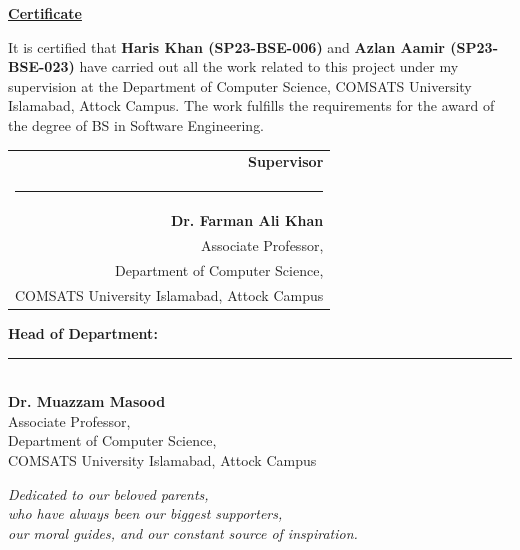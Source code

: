 \documentclass[A4paper,12pt]{report}
\theoremstyle{plain}
\theoremstyle{definition}
\theoremstyle{remark}
\numberwithin{equation}{section}
\begin{document}
\newpage
\begin{center}
\Large{\textbf{\underline{Certificate}}}
\end{center}
\vspace{0.2in}
\noindent It is certified that \textbf{Haris Khan (SP23-BSE-006)} and \textbf{Azlan Aamir (SP23-BSE-023)} have carried out all the work related to this project under my supervision at the Department of Computer Science, COMSATS University Islamabad, Attock Campus. The work fulfills the requirements for the award of the degree of BS in Software Engineering.
\\[0.4in]
\begin{flushright}
\begin{tabular}{@{}r@{}}
\textbf{Supervisor} \\[0.2in]
\rule{6cm}{0.4pt} \\
\textbf{Dr. Farman Ali Khan} \\
Associate Professor, \\
Department of Computer Science, \\
COMSATS University Islamabad, Attock Campus
\end{tabular}
\end{flushright}

\vspace{0.3in}
\begin{flushleft}
\textbf{Head of Department:} \\[0.2in]
\rule{6cm}{0.4pt} \\
\textbf{Dr. Muazzam Masood} \\
Associate Professor, \\
Department of Computer Science, \\
COMSATS University Islamabad, Attock Campus
\end{flushleft}

\newpage
\begin{center}
\vspace*{\fill}
\Large\textit{Dedicated to our beloved parents,\\
    who have always been our biggest supporters,\\
    our moral guides, and our constant source of inspiration.}\\
\vspace*{\fill}
\end{center}
\end{document}
